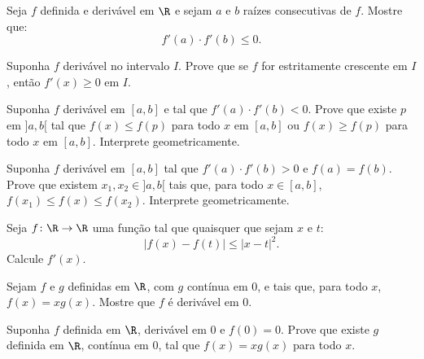 \begin{exercicio}[43]
Seja $f$ definida e derivável em $\R$ e sejam $a$ e $b$ raízes consecutivas de $f$. Mostre que:
\[
f'(a) \cdot f'(b) \le 0.
\]
\end{exercicio}

\begin{exercicio}[44]
Suponha $f$ derivável no intervalo $I$. Prove que se $f$ for estritamente crescente em $I$, então $f'(x) \ge 0$ em $I$.
\end{exercicio}

\begin{exercicio}[45]
Suponha $f$ derivável em $[a, b]$ e tal que $f'(a) \cdot f'(b) < 0$. Prove que existe $p$ em ${]a, b[}$ tal que $f(x) \le f(p)$ para todo $x$ em $[a, b]$ ou $f(x) \ge f(p)$ para todo $x$ em $[a, b]$. Interprete geometricamente.
\end{exercicio}

\begin{exercicio}[46]
Suponha $f$ derivável em $[a, b]$ tal que $f'(a) \cdot f'(b) > 0$ e $f(a) = f(b)$. Prove que existem $x_1, x_2 \in {]a, b[}$ tais que, para todo $x \in [a, b]$, $f(x_1) \le f(x) \le f(x_2)$. Interprete geometricamente.
\end{exercicio}

\begin{exercicio}[47]
Seja $f\colon \R \to \R$ uma função tal que quaisquer que sejam $x$ e $t$:
\[
|f(x) - f(t)| \le |x - t|^2.
\]
Calcule $f'(x)$.
\end{exercicio}

\begin{exercicio}[48]
Sejam $f$ e $g$ definidas em $\R$, com $g$ contínua em 0, e tais que, para todo $x$, $f(x) = xg(x)$. Mostre que $f$ é derivável em 0.
\end{exercicio}

\begin{exercicio}[49]
Suponha $f$ definida em $\R$, derivável em 0 e $f(0) = 0$. Prove que existe $g$ definida em $\R$, contínua em 0, tal que $f(x) = xg(x)$ para todo $x$.
\end{exercicio}

